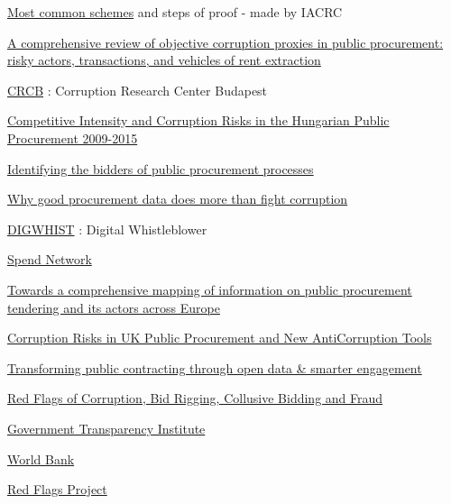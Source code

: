 \documentclass{book}
\begin{document}
\href{https://guide.iacrc.org/proof-of-common-schemes/}{Most common schemes} and steps of proof - made by IACRC

\href{https://digiwhist.eu/wp-content/uploads/2016/08/GTI_WP2016_3_Fazekas-Cingolani-Toth_Conceptualising-PP-corr_160821.pdf}{A comprehensive review of objective corruption proxies in public procurement: risky actors, transactions, and vehicles of rent extraction}

\href{https://www.crcb.eu/}{CRCB} : Corruption Research Center Budapest

\href{https://www.crcb.eu/wp-content/uploads/2016/08/crcb_2016_ijtoth_mhajdu_competitive_intensity_160820_.pdf}{Competitive Intensity and Corruption Risks in the Hungarian Public Procurement 2009-2015} 

\href{https://okfn.de/blog/2016/06/who-has-won-the-contract/}{Identifying the bidders of public procurement processes} 

\href{https://www.openopps.com/blog/post/21/why-good-procurement-data-does-more-than-fight-corruption/}{Why good procurement data does more than fight corruption}

\href{https://digiwhist.eu/}{DIGWHIST} : Digital Whistleblower

\href{https://spendnetwork.com/}{Spend Network}

\href{https://digiwhist.eu/publications/towards-a-comprehensive-mapping-of-information-on-public-procurement-tendering-and-its-actors-across-europe/}{Towards a comprehensive mapping of information on public procurement tendering and its actors across Europe} 

\href{https://www.govtransparency.eu/wp-content/uploads/2016/10/Fazekas-David-Barrett_Public-procurement-review_public_151113.pdf}{Corruption Risks in UK Public Procurement and New AntiCorruption Tools} 

\href{https://www.open-contracting.org/what-is-open-contracting/}{Transforming public contracting through open data \& smarter engagement}

\href{https://guide.iacrc.org/the-red-flags-of-corruption-bid-rigging-collusive-bidding-and-fraud/}{Red Flags of Corruption, Bid Rigging, Collusive Bidding and Fraud}

\href{https://guide.iacrc.org/the-red-flags-of-corruption-bid-rigging-collusive-bidding-and-fraud/}{Government Transparency Institute}

\href{https://bpp.worldbank.org/}{World Bank}

\href{https://www.redflags.eu/}{Red Flags Project}
\end{document}
